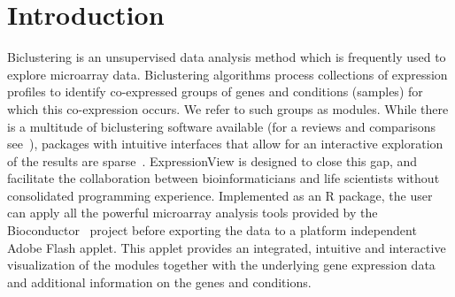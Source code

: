 \documentclass[round]{bioinfo}
\begin{document}
\vspace*{-7pt}
\section{Introduction}
Biclustering is an unsupervised data analysis method which is
frequently used to explore microarray data. Biclustering algorithms
process collections of expression profiles to identify co-expressed groups of
genes and conditions (samples) for which this co-expression occurs. 
We refer to such groups as modules. While
there is a multitude of biclustering software available (for a reviews 
and comparisons see~\cite{madeira04,ihmels04,prelic06}), packages with 
intuitive interfaces that allow for an interactive exploration of the results are
sparse~\citep{santamaria08}. ExpressionView is designed to close this
gap, and facilitate the collaboration between bioinformaticians and
life scientists without consolidated programming
experience. Implemented as an R package, the user can apply all the
powerful microarray analysis tools provided by the
Bioconductor~\citep{gentleman04} project before exporting the data to
a platform independent Adobe Flash applet. This applet
provides an integrated, intuitive and interactive visualization of
the modules together with the underlying gene expression data and
additional information on the genes and conditions.

\vspace*{-7pt}
\end{document}
